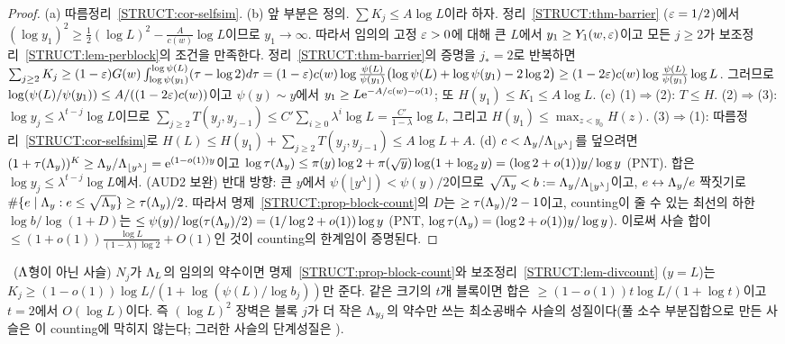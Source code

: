 \begin{proof}
(a) 따름정리~\ref{STRUCT:cor-selfsim}. (b) 앞 부분은 정의. $\sum K_j\le A\log L$이라 하자. 정리~\ref{STRUCT:thm-barrier} ($\varepsilon=1/2$)에서 $(\log y_1)^2\ge\frac12(\log L)^2-\frac{A}{c(w)}\log L$이므로 $y_1\to\infty$. 따라서 임의의 고정 $\varepsilon>0$에 대해 큰 $L$에서 $y_1\ge Y_1(w,\varepsilon)$이고 모든 $j\ge2$가 보조정리~\ref{STRUCT:lem-perblock}의 조건을 만족한다. 정리~\ref{STRUCT:thm-barrier}의 증명을 $j_*=2$로 반복하면
$\sum_{j\ge2}K_j\ge(1-\varepsilon)G(w)\int_{\log\psi(y_1)}^{\log\psi(L)}(\tau-\log2)d\tau=(1-\varepsilon)c(w)\log\frac{\psi(L)}{\psi(y_1)}\bigl(\log\psi(L)+\log\psi(y_1)-2\log2\bigr)\ge(1-2\varepsilon)c(w)\log\frac{\psi(L)}{\psi(y_1)}\log L$.
그러므로 $\log(\psi(L)/\psi(y_1))\le A/((1-2\varepsilon)c(w))$이고 $\psi(y)\sim y$에서 $y_1\ge L\mathrm{e}^{-A/c(w)-o(1)}$; 또 $H(y_1)\le K_1\le A\log L$.
(c) (1)$\Rightarrow$(2): $T\le H$. (2)$\Rightarrow$(3): $\log y_j\le\lambda^{t-j}\log L$이므로 $\sum_{j\ge2}T(y_j,y_{j-1})\le C'\sum_{i\ge0}\lambda^i\log L=\frac{C'}{1-\lambda}\log L$, 그리고 $H(y_1)\le\max_{z<y_0}H(z)$. (3)$\Rightarrow$(1): 따름정리~\ref{STRUCT:cor-selfsim}로 $H(L)\le H(y_1)+\sum_{j\ge2}T(y_j,y_{j-1})\le A\log L+A$.
(d) $c<\Lambda_y/\Lambda_{\lfloor y^\lambda\rfloor}$를 덮으려면 $(1+\tau(\Lambda_y))^K\ge\Lambda_y/\Lambda_{\lfloor y^\lambda\rfloor}=\mathrm{e}^{(1-o(1))y}$이고 $\log\tau(\Lambda_y)\le\pi(y)\log2+\pi(\sqrt y)\log(1+\log_2y)=(\log2+o(1))y/\log y$ (PNT). 합은 $\log y_j\le\lambda^{t-j}\log L$에서.
(AUD2 보완) 반대 방향: 큰 $y$에서 $\psi(\lfloor y^\lambda\rfloor)<\psi(y)/2$이므로 $\sqrt{\Lambda_y}<b:=\Lambda_y/\Lambda_{\lfloor y^\lambda\rfloor}$이고, $e\leftrightarrow\Lambda_y/e$ 짝짓기로 $\#\{e\mid\Lambda_y:e\le\sqrt{\Lambda_y}\}\ge\tau(\Lambda_y)/2$. 따라서 명제~\ref{STRUCT:prop-block-count}의 $D$는 $\ge\tau(\Lambda_y)/2-1$이고, counting이 줄 수 있는 최선의 하한 $\log b/\log(1+D)$는 $\le\psi(y)/\log(\tau(\Lambda_y)/2)=(1/\log2+o(1))\log y$ (PNT, $\log\tau(\Lambda_y)=(\log2+o(1))y/\log y$). 이로써 사슬 합이 $\le(1+o(1))\frac{\log L}{(1-\lambda)\log2}+O(1)$인 것이 counting의 한계임이 증명된다.
\end{proof}

\begin{remark}\label{STRUCT:rem-general-chain}
\PROVED\ ($\Lambda$형이 아닌 사슬) $N_j$가 $\Lambda_L$의 임의의 약수이면 명제~\ref{STRUCT:prop-block-count}와 보조정리~\ref{STRUCT:lem-divcount} ($y=L$)는 $K_j\ge(1-o(1))\log L/(1+\log(\psi(L)/\log b_j))$만 준다. 같은 크기의 $t$개 블록이면 합은 $\ge(1-o(1))t\log L/(1+\log t)$이고 $t=2$에서 $O(\log L)$이다. 즉 $(\log L)^2$ 장벽은 블록 $j$가 더 작은 $\Lambda_{y_j}$의 약수만 쓰는 최소공배수 사슬의 성질이다(풀 소수 부분집합으로 만든 사슬은 이 counting에 막히지 않는다; 그러한 사슬의 단계성질은 \OPEN).
\end{remark}

